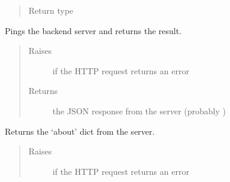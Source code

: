 \documentclass[letterpaper,10pt,english]{sphinxmanual}
\begin{document}
\begin{fulllineitems}
\begin{fulllineitems}
\begin{quote}
\begin{description}
\item[{Return type}] \leavevmode
\sphinxAtStartPar
{}

\end{description}\end{quote}

\end{fulllineitems}


\begin{fulllineitems}
\label{\detokenize{autoapi/pine/client/index:pine.client.PineClient.ping}}
\sphinxAtStartPar
Pings the backend server and returns the result.
\begin{quote}\begin{description}
\item[{Raises}] \leavevmode
\sphinxAtStartPar
{\hyperref[\detokenize{autoapi/pine/client/exceptions/index:pine.client.exceptions.PineClientHttpException}]{}} \textendash{} if the HTTP request returns an error

\item[{Returns}] \leavevmode
\sphinxAtStartPar
the JSON response from the server (probably )

\end{description}\end{quote}

\end{fulllineitems}


\begin{fulllineitems}
\label{\detokenize{autoapi/pine/client/index:pine.client.PineClient.about}}
\sphinxAtStartPar
Returns the ‘about’ dict from the server.
\begin{quote}\begin{description}
\item[{Raises}] \leavevmode
\sphinxAtStartPar
{\hyperref[\detokenize{autoapi/pine/client/exceptions/index:pine.client.exceptions.PineClientHttpException}]{}} \textendash{} if the HTTP request returns an error


\end{description}
\end{quote}
\end{fulllineitems}
\end{fulllineitems}
\end{document}
